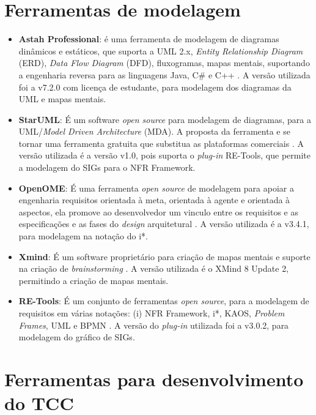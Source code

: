 \section{Ferramentas de modelagem}
\label{sec:ferramentasModelagem}

\begin{itemize}
	\item \textbf{Astah Professional}: é uma ferramenta de modelagem de diagramas dinâmicos e estáticos, que suporta a UML 2.x, \textit{Entity Relationship Diagram} (ERD), \textit{Data Flow Diagram} (DFD), fluxogramas, mapas mentais, suportando a engenharia reversa para as linguagens Java, C\# e C++ \cite{astah}. A versão utilizada foi a v7.2.0 com licença de estudante, para modelagem dos diagramas da UML e mapas mentais.   
	\item \textbf{StarUML}: É um software \textit{open source} para modelagem de diagramas, para a UML/\textit{Model Driven Architecture} (MDA). A proposta da ferramenta e se tornar uma ferramenta gratuita que substitua as plataformas comerciais \cite{starUML}. A versão utilizada é a versão v1.0, pois suporta o \textit{plug-in} RE-Tools, que permite a modelagem do SIGs para o NFR Framework. 
	\item \textbf{OpenOME}: É uma ferramenta \textit{open source} de modelagem para apoiar a engenharia requisitos orientada à meta, orientada à agente e orientada à aspectos, ela promove ao desenvolvedor um vinculo entre os requisitos e as especificações e as fases do \textit{design} arquitetural \cite{openOME}. A versão utilizada é a v3.4.1, para modelagem na notação do i*. 
	\item \textbf{Xmind}: É um software proprietário para criação de mapas mentais e suporte na criação de \textit{brainstorming} \cite{xMind}. A versão utilizada é o XMind 8 Update 2, permitindo a criação de mapas mentais. 
	\item \textbf{RE-Tools}: É um conjunto de ferramentas \textit{open source}, para a modelagem de requisitos em várias notações: (i) NFR Framework, i*, KAOS, \textit{Problem Frames}, UML e BPMN \cite{reTools}. A versão do \textit{plug-in} utilizada foi a v3.0.2, para modelagem do gráfico de SIGs.   
\end{itemize}

\section{Ferramentas para desenvolvimento do TCC}
\label{sec:ferramentasDesenvolvimento}

